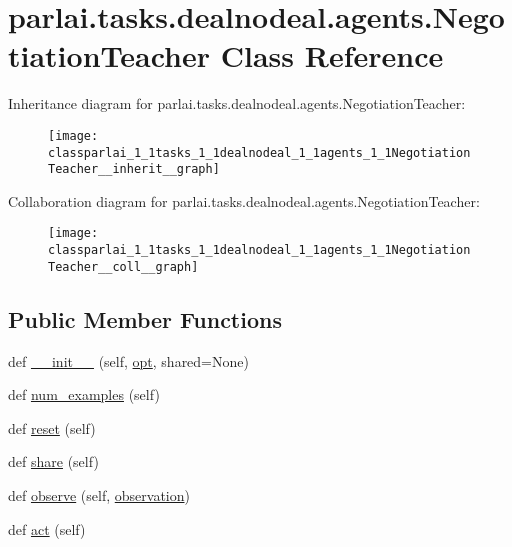 \hypertarget{classparlai_1_1tasks_1_1dealnodeal_1_1agents_1_1NegotiationTeacher}{}\section{parlai.\+tasks.\+dealnodeal.\+agents.\+Negotiation\+Teacher Class Reference}
\label{classparlai_1_1tasks_1_1dealnodeal_1_1agents_1_1NegotiationTeacher}


Inheritance diagram for parlai.\+tasks.\+dealnodeal.\+agents.\+Negotiation\+Teacher\+:
\nopagebreak
\begin{figure}[H]
\begin{center}
\leavevmode
\texttt{[image: classparlai\_1\_1tasks\_1\_1dealnodeal\_1\_1agents\_1\_1NegotiationTeacher\_\_inherit\_\_graph]}
\end{center}
\end{figure}


Collaboration diagram for parlai.\+tasks.\+dealnodeal.\+agents.\+Negotiation\+Teacher\+:
\nopagebreak
\begin{figure}[H]
\begin{center}
\leavevmode
\texttt{[image: classparlai\_1\_1tasks\_1\_1dealnodeal\_1\_1agents\_1\_1NegotiationTeacher\_\_coll\_\_graph]}
\end{center}
\end{figure}
\subsection*{Public Member Functions}
\begin{DoxyCompactItemize}
\item 
def \hyperlink{classparlai_1_1tasks_1_1dealnodeal_1_1agents_1_1NegotiationTeacher_a9de97fc6a23cc7ec25dca19ad381c4b9}{\+\_\+\+\_\+init\+\_\+\+\_\+} (self, \hyperlink{classparlai_1_1core_1_1agents_1_1Teacher_a3ce6243860ce978a897922863ed32fa4}{opt}, shared=None)
\item 
def \hyperlink{classparlai_1_1tasks_1_1dealnodeal_1_1agents_1_1NegotiationTeacher_a87d200e80614ec6ac4b7611d698f22f5}{num\+\_\+examples} (self)
\item 
def \hyperlink{classparlai_1_1tasks_1_1dealnodeal_1_1agents_1_1NegotiationTeacher_a20b0ed1425ed8b1c6bc179220b766b19}{reset} (self)
\item 
def \hyperlink{classparlai_1_1tasks_1_1dealnodeal_1_1agents_1_1NegotiationTeacher_a915e9437d2b0dc50973b3eea1711108b}{share} (self)
\item 
def \hyperlink{classparlai_1_1tasks_1_1dealnodeal_1_1agents_1_1NegotiationTeacher_aa1a512ed945c5fc33a90005b25ef817f}{observe} (self, \hyperlink{classparlai_1_1core_1_1agents_1_1Agent_aedbecc4b4aa7af7413882a0429e0f1db}{observation})
\item 
def \hyperlink{classparlai_1_1tasks_1_1dealnodeal_1_1agents_1_1NegotiationTeacher_a840acd160a3c71edd83a4e6d227dbd1f}{act} (self)
\end{DoxyCompactItemize}
